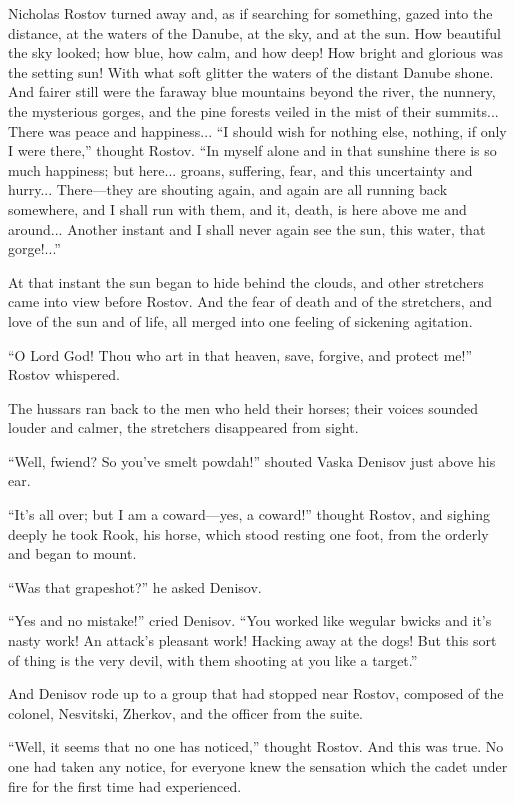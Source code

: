 Nicholas Rostov turned away and, as if searching for something,
gazed into the distance, at the waters of the Danube, at the sky,
and at the sun. How beautiful the sky looked; how blue, how calm,
and how deep! How bright and glorious was the setting sun! With
what soft glitter the waters of the distant Danube shone. And
fairer still were the faraway blue mountains beyond the river,
the nunnery, the mysterious gorges, and the pine forests veiled
in the mist of their summits... There was peace and
happiness... ``I should wish for nothing else, nothing, if only I
were there,'' thought Rostov. ``In myself alone and in that
sunshine there is so much happiness; but here... groans,
suffering, fear, and this uncertainty and hurry... There---they
are shouting again, and again are all running back somewhere, and
I shall run with them, and it, death, is here above me and
around... Another instant and I shall never again see the sun,
this water, that gorge!...''

At that instant the sun began to hide behind the clouds, and
other stretchers came into view before Rostov. And the fear of
death and of the stretchers, and love of the sun and of life, all
merged into one feeling of sickening agitation.

``O Lord God! Thou who art in that heaven, save, forgive, and
protect me!'' Rostov whispered.

The hussars ran back to the men who held their horses; their
voices sounded louder and calmer, the stretchers disappeared from
sight.

``Well, fwiend? So you've smelt powdah!'' shouted Vaska Denisov
just above his ear.

``It's all over; but I am a coward---yes, a coward!'' thought
Rostov, and sighing deeply he took Rook, his horse, which stood
resting one foot, from the orderly and began to mount.

``Was that grapeshot?'' he asked Denisov.

``Yes and no mistake!'' cried Denisov. ``You worked like wegular
bwicks and it's nasty work! An attack's pleasant work! Hacking
away at the dogs!  But this sort of thing is the very devil, with
them shooting at you like a target.''

And Denisov rode up to a group that had stopped near Rostov,
composed of the colonel, Nesvitski, Zherkov, and the officer from
the suite.

``Well, it seems that no one has noticed,'' thought Rostov. And
this was true. No one had taken any notice, for everyone knew the
sensation which the cadet under fire for the first time had
experienced.


